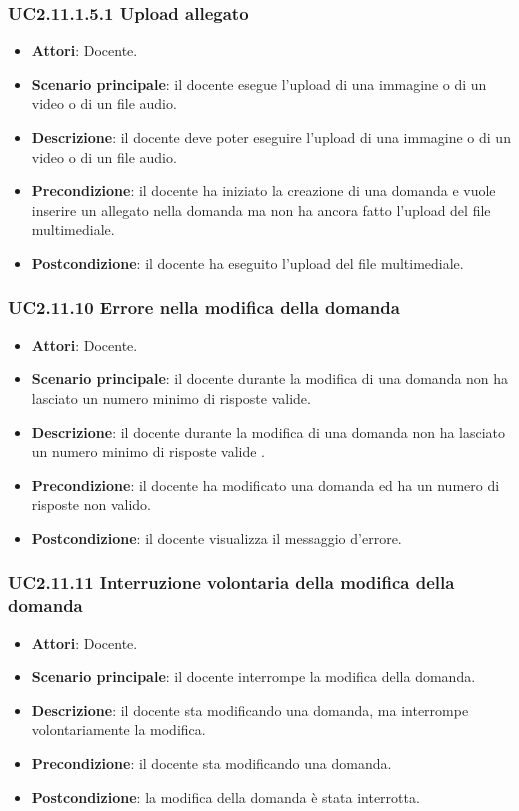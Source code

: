 \subsubsection{UC2.11.1.5.1 Upload allegato}
\begin{itemize}
\item \textbf{Attori}: Docente.
\item \textbf{Scenario principale}: il docente esegue l'upload di una immagine o di un video o di un file audio.
\item \textbf{Descrizione}: il docente deve poter eseguire l'upload di una immagine o di un video o di un file audio.
\item \textbf{Precondizione}: il docente ha iniziato la creazione di una domanda e vuole inserire un allegato nella domanda ma non ha ancora fatto l'upload del file multimediale.
\item \textbf{Postcondizione}: il docente ha eseguito l'upload del file multimediale.
\end{itemize}
\subsubsection{UC2.11.10 Errore nella modifica della domanda}
\begin{itemize}
\item \textbf{Attori}: Docente.
\item \textbf{Scenario principale}: il docente durante la modifica di una domanda non ha lasciato un numero minimo di risposte valide.
\item \textbf{Descrizione}: il docente durante la modifica di una domanda non ha lasciato un numero minimo di risposte valide
.
\item \textbf{Precondizione}: il docente ha modificato una domanda ed ha un numero di risposte non valido.
\item \textbf{Postcondizione}: il docente visualizza il messaggio d'errore.
\end{itemize}
\subsubsection{UC2.11.11 Interruzione volontaria della modifica della domanda}
\begin{itemize}
\item \textbf{Attori}: Docente.
\item \textbf{Scenario principale}: il docente interrompe la modifica della domanda.
\item \textbf{Descrizione}: il docente sta modificando una domanda, ma interrompe volontariamente la modifica.
\item \textbf{Precondizione}: il docente sta modificando una domanda.
\item \textbf{Postcondizione}: la modifica della domanda è stata interrotta.
\end{itemize}
